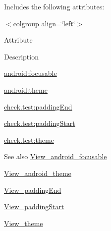 Includes the following attributes\+:

\begin{TabularC}{0}
\hline
\end{TabularC}
$<$colgroup align=\char`\"{}left\char`\"{}$>$ 

Attribute

Description 

{\ttfamily \hyperlink{classcheck_1_1test_1_1_r_1_1styleable_a92aa4c0c838d8cd1dbd8bbcbdcdaa904}{android\+:focusable}}

{\ttfamily \hyperlink{classcheck_1_1test_1_1_r_1_1styleable_a183c98f0eb7fd5d876f22dc7611d3e5a}{android\+:theme}}

{\ttfamily \hyperlink{classcheck_1_1test_1_1_r_1_1styleable_a77eb809eaf7c2d90a2605681fd89ab20}{check.\+test\+:padding\+End}}

{\ttfamily \hyperlink{classcheck_1_1test_1_1_r_1_1styleable_a802b6e1c0429edd87c36d355b095d838}{check.\+test\+:padding\+Start}}

{\ttfamily \hyperlink{classcheck_1_1test_1_1_r_1_1styleable_a2c622119b55ec8f1cab226d62d3022bf}{check.\+test\+:theme}}

\begin{DoxySeeAlso}{See also}
\hyperlink{classcheck_1_1test_1_1_r_1_1styleable_a92aa4c0c838d8cd1dbd8bbcbdcdaa904}{View\+\_\+android\+\_\+focusable} 

\hyperlink{classcheck_1_1test_1_1_r_1_1styleable_a183c98f0eb7fd5d876f22dc7611d3e5a}{View\+\_\+android\+\_\+theme} 

\hyperlink{classcheck_1_1test_1_1_r_1_1styleable_a77eb809eaf7c2d90a2605681fd89ab20}{View\+\_\+padding\+End} 

\hyperlink{classcheck_1_1test_1_1_r_1_1styleable_a802b6e1c0429edd87c36d355b095d838}{View\+\_\+padding\+Start} 

\hyperlink{classcheck_1_1test_1_1_r_1_1styleable_a2c622119b55ec8f1cab226d62d3022bf}{View\+\_\+theme} 
\end{DoxySeeAlso}
\hypertarget{classcheck_1_1test_1_1_r_1_1styleable_a92aa4c0c838d8cd1dbd8bbcbdcdaa904}{}
